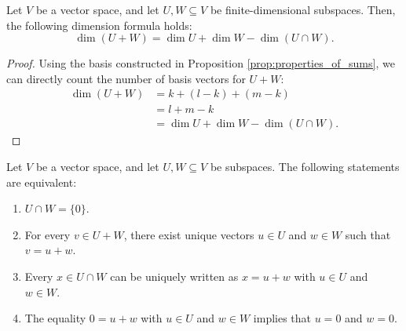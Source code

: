 \begin{theorem}
\label{thm:dimension_formula_sums}
Let $V$ be a vector space, and let $U, W \subseteq V$ be finite-dimensional subspaces. Then, the following dimension formula holds:
\[
\dim(U + W) = \dim U + \dim W - \dim(U \cap W).
\]
\end{theorem}

\begin{proof}
Using the basis constructed in Proposition \ref{prop:properties_of_sums}, we can directly count the number of basis vectors for $U + W$:
\begin{align*}
\dim(U + W) &= k + (l - k) + (m - k) \\
&= l + m - k \\
&= \dim U + \dim W - \dim(U \cap W).
\end{align*}
\end{proof}

\begin{corollary}
\label{cor:trivial_intersection}
Let $V$ be a vector space, and let $U, W \subseteq V$ be subspaces. The following statements are equivalent:
\begin{enumerate}
    \item $U \cap W = \{0\}$.
    \item For every $v \in U + W$, there exist unique vectors $u \in U$ and $w \in W$ such that $v = u + w$.
    \item Every $x \in U \cap W$ can be uniquely written as $x = u + w$ with $u \in U$ and $w \in W$.
    \item The equality $0 = u + w$ with $u \in U$ and $w \in W$ implies that $u = 0$ and $w = 0$.
\end{enumerate}
\end{corollary}

